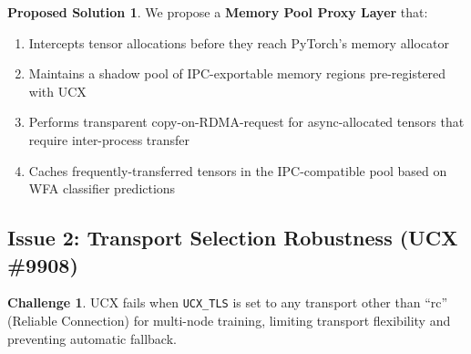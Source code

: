 \documentclass[11pt,letterpaper]{article}
\theoremstyle{definition}
\newtheorem{challenge}{Challenge}
\newtheorem{solution}{Proposed Solution}
\begin{document}
\begin{solution}
We propose a \textbf{Memory Pool Proxy Layer} that:
\begin{enumerate}
    \item Intercepts tensor allocations before they reach PyTorch's memory allocator
    \item Maintains a shadow pool of IPC-exportable memory regions pre-registered with UCX
    \item Performs transparent copy-on-RDMA-request for async-allocated tensors that require inter-process transfer
    \item Caches frequently-transferred tensors in the IPC-compatible pool based on WFA classifier predictions
\end{enumerate}
\end{solution}

\subsection{Issue 2: Transport Selection Robustness (UCX \#9908)}

\begin{challenge}
UCX fails when \texttt{UCX\_TLS} is set to any transport other than ``rc'' (Reliable Connection) for multi-node training, limiting transport flexibility and preventing automatic fallback.
\end{challenge}
\end{document}
